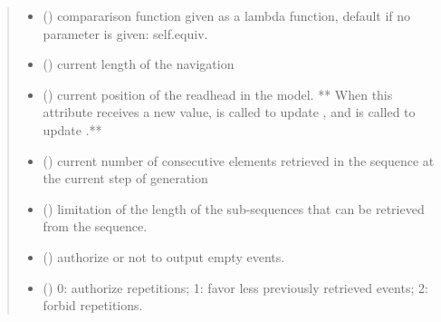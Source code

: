 \documentclass[letterpaper,10pt,english]{sphinxmanual}
\begin{document}
\begin{fulllineitems}
\begin{quote}
\begin{description}
\begin{itemize}
\item {} 
 () \textendash{} compararison function given as a lambda function, default if no parameter is given: self.equiv.

\item {} 
 () \textendash{} current length of the navigation

\item {} 
 () \textendash{} current position of the readhead in the model. ** When this attribute receives a new value, {\hyperref[\detokenize{index:Navigator.Navigator.record_execution_trace}]{}} is called to update , and {\hyperref[\detokenize{index:Navigator.Navigator.update_history_and_taboos}]{}} is called to update .**

\item {} 
 () \textendash{} current number of consecutive elements retrieved in the sequence at the current step of generation

\item {} 
 () \textendash{} limitation of the length of the sub-sequences that can be retrieved from the sequence.

\item {} 
 () \textendash{} authorize or not to output empty events.

\item {} 
 () \textendash{} 0: authorize repetitions; 1: favor less previously retrieved events; 2: forbid repetitions.


\end{itemize}
\end{description}
\end{quote}
\end{fulllineitems}
\end{document}
